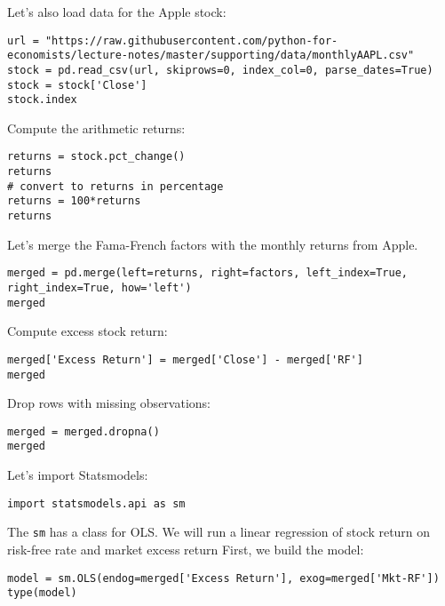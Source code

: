 \documentclass[12pt, a4paper]{article}
\begin{document}
Let's also load data for the Apple stock:
\lstset{language=jupyter-python,label= ,caption= ,captionpos=b,numbers=none}
\begin{lstlisting}
url = "https://raw.githubusercontent.com/python-for-economists/lecture-notes/master/supporting/data/monthlyAAPL.csv"
stock = pd.read_csv(url, skiprows=0, index_col=0, parse_dates=True)
stock = stock['Close']
stock.index
\end{lstlisting}

Compute the arithmetic returns:
\lstset{language=jupyter-python,label= ,caption= ,captionpos=b,numbers=none}
\begin{lstlisting}
returns = stock.pct_change()
returns
# convert to returns in percentage
returns = 100*returns
returns
\end{lstlisting}

Let's merge the Fama-French factors with the monthly returns from Apple.
\lstset{language=jupyter-python,label= ,caption= ,captionpos=b,numbers=none}
\begin{lstlisting}
merged = pd.merge(left=returns, right=factors, left_index=True, right_index=True, how='left')
merged
\end{lstlisting}

Compute excess stock return:
\lstset{language=jupyter-python,label= ,caption= ,captionpos=b,numbers=none}
\begin{lstlisting}
merged['Excess Return'] = merged['Close'] - merged['RF']
merged
\end{lstlisting}

Drop rows with missing observations:
\lstset{language=jupyter-python,label= ,caption= ,captionpos=b,numbers=none}
\begin{lstlisting}
merged = merged.dropna()
merged
\end{lstlisting}

Let's import Statsmodels:
\lstset{language=jupyter-python,label= ,caption= ,captionpos=b,numbers=none}
\begin{lstlisting}
import statsmodels.api as sm
\end{lstlisting}

The \texttt{sm} has a class for OLS.
We will run a linear regression of stock return on risk-free rate and market excess return
First, we build the model:
\lstset{language=jupyter-python,label= ,caption= ,captionpos=b,numbers=none}
\begin{lstlisting}
model = sm.OLS(endog=merged['Excess Return'], exog=merged['Mkt-RF'])
type(model)
\end{lstlisting}
\end{document}
